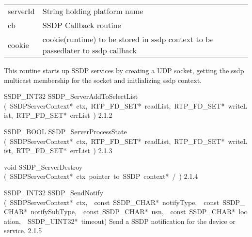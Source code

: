 \documentclass{article}
\begin{document}
\begin{cxxentry}
\begin{cxxentry}
\begin{cxxfunction}
{\begin{tabular}[t]{lp{}}
\\
{\tt\strut serverId} & String holding platform name 
\\
{\tt\strut cb} & SSDP Callback routine 
\\
{\tt\strut cookie} & cookie(runtime) to be stored in ssdp context to be passedlater to ssdp callback 
\end{tabular}}
\begin{cxxdoc}
This routine starts up SSDP services by creating a UDP socket, getting the ssdp
multicast membership for the socket and initlializing ssdp context.


\end{cxxdoc}
\end{cxxfunction}
\begin{cxxfunction}
{SSDP\_INT32}
        {SSDP\_ServerAddToSelectList}
        {(\ SSDPServerContext*\ ctx,\ RTP\_FD\_SET*\ readList,\ RTP\_FD\_SET*\ writeList,\ RTP\_FD\_SET*\ errList\ )}
        {}
        {2.1.2}
\end{cxxfunction}
\begin{cxxfunction}
{SSDP\_BOOL}
        {SSDP\_ServerProcessState}
        {(\ SSDPServerContext*\ ctx,\ RTP\_FD\_SET*\ readList,\ RTP\_FD\_SET*\ writeList,\ RTP\_FD\_SET*\ errList\ )}
        {}
        {2.1.3}
\end{cxxfunction}
\begin{cxxfunction}
{void}
        {SSDP\_ServerDestroy}
        {(\ SSDPServerContext*\ ctx\ pointer\ to\ SSDP\ context*\ /\ )}
        {}
        {2.1.4}
\end{cxxfunction}
\begin{cxxfunction}
{SSDP\_INT32}
        {SSDP\_SendNotify}
        {(\ SSDPServerContext*\ ctx,\ \ const\ SSDP\_CHAR*\ notifyType,\ \ const\ SSDP\_CHAR*\ notifySubType,\ \ const\ SSDP\_CHAR*\ usn,\ \ const\ SSDP\_CHAR*\ location,\ \ SSDP\_UINT32*\ timeout)}
        {Send a SSDP notification for the device or service. }
        {2.1.5}
\end{cxxfunction}
\end{cxxentry}
\end{cxxentry}
\end{document}

